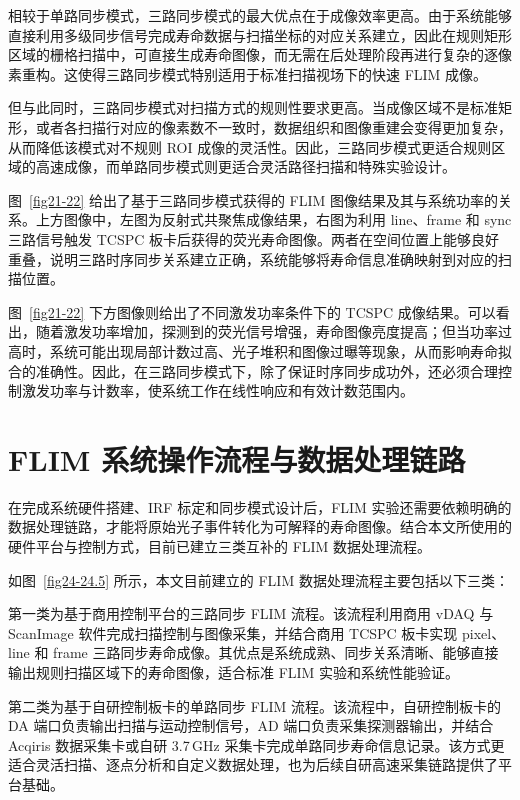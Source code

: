 相较于单路同步模式，三路同步模式的最大优点在于成像效率更高。由于系统能够直接利用多级同步信号完成寿命数据与扫描坐标的对应关系建立，因此在规则矩形区域的栅格扫描中，可直接生成寿命图像，而无需在后处理阶段再进行复杂的逐像素重构。这使得三路同步模式特别适用于标准扫描视场下的快速 FLIM 成像。

但与此同时，三路同步模式对扫描方式的规则性要求更高。当成像区域不是标准矩形，或者各扫描行对应的像素数不一致时，数据组织和图像重建会变得更加复杂，从而降低该模式对不规则 ROI 成像的灵活性。因此，三路同步模式更适合规则区域的高速成像，而单路同步模式则更适合灵活路径扫描和特殊实验设计。

图~\ref{fig21-22} 给出了基于三路同步模式获得的 FLIM 图像结果及其与系统功率的关系。上方图像中，左图为反射式共聚焦成像结果，右图为利用 line、frame 和 sync 三路信号触发 TCSPC 板卡后获得的荧光寿命图像。两者在空间位置上能够良好重叠，说明三路时序同步关系建立正确，系统能够将寿命信息准确映射到对应的扫描位置。

图~\ref{fig21-22} 下方图像则给出了不同激发功率条件下的 TCSPC 成像结果。可以看出，随着激发功率增加，探测到的荧光信号增强，寿命图像亮度提高；但当功率过高时，系统可能出现局部计数过高、光子堆积和图像过曝等现象，从而影响寿命拟合的准确性。因此，在三路同步模式下，除了保证时序同步成功外，还必须合理控制激发功率与计数率，使系统工作在线性响应和有效计数范围内。




\section{FLIM 系统操作流程与数据处理链路}\label{5.4}

在完成系统硬件搭建、IRF 标定和同步模式设计后，FLIM 实验还需要依赖明确的数据处理链路，才能将原始光子事件转化为可解释的寿命图像。结合本文所使用的硬件平台与控制方式，目前已建立三类互补的 FLIM 数据处理流程。

如图~\ref{fig24-24.5} 所示，本文目前建立的 FLIM 数据处理流程主要包括以下三类：

第一类为基于商用控制平台的三路同步 FLIM 流程。该流程利用商用 vDAQ 与 ScanImage 软件完成扫描控制与图像采集，并结合商用 TCSPC 板卡实现 pixel、line 和 frame 三路同步寿命成像。其优点是系统成熟、同步关系清晰、能够直接输出规则扫描区域下的寿命图像，适合标准 FLIM 实验和系统性能验证。

第二类为基于自研控制板卡的单路同步 FLIM 流程。该流程中，自研控制板卡的 DA 端口负责输出扫描与运动控制信号，AD 端口负责采集探测器输出，并结合 Acqiris 数据采集卡或自研 3.7\,GHz 采集卡完成单路同步寿命信息记录。该方式更适合灵活扫描、逐点分析和自定义数据处理，也为后续自研高速采集链路提供了平台基础。

